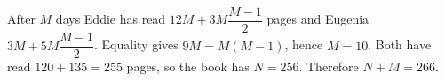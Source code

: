 After $M$ days Eddie has read $12M+3M\dfrac{M-1}{2}$ pages and Eugenia $3M+5M\dfrac{M-1}{2}$. Equality gives $9M=M(M-1)$, hence $M=10$. Both have read $120+135=255$ pages, so the book has $N=256$. Therefore $\boxed{N+M=266}$.
